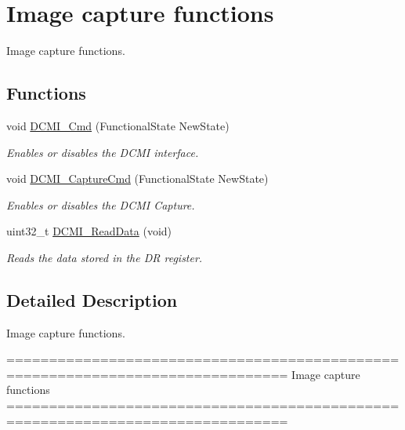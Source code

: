 \hypertarget{group___d_c_m_i___group2}{\section{Image capture functions}
\label{group___d_c_m_i___group2}
}


Image capture functions.  


\subsection*{Functions}
\begin{DoxyCompactItemize}
\item 
void \hyperlink{group___d_c_m_i___group2_ga36bba54c40637b8071aea8ffea71fb84}{D\-C\-M\-I\-\_\-\-Cmd} (Functional\-State New\-State)
\begin{DoxyCompactList}\small\item\em Enables or disables the D\-C\-M\-I interface. \end{DoxyCompactList}\item 
void \hyperlink{group___d_c_m_i___group2_gad00fb33497ffa337a5b2b77fc6aa8d74}{D\-C\-M\-I\-\_\-\-Capture\-Cmd} (Functional\-State New\-State)
\begin{DoxyCompactList}\small\item\em Enables or disables the D\-C\-M\-I Capture. \end{DoxyCompactList}\item 
uint32\-\_\-t \hyperlink{group___d_c_m_i___group2_ga475305bd8694e4cebefcb263c0a5b979}{D\-C\-M\-I\-\_\-\-Read\-Data} (void)
\begin{DoxyCompactList}\small\item\em Reads the data stored in the D\-R register. \end{DoxyCompactList}\end{DoxyCompactItemize}


\subsection{Detailed Description}
Image capture functions. \begin{DoxyVerb} ===============================================================================
                                 Image capture functions
 ===============================================================================  \end{DoxyVerb}
 

